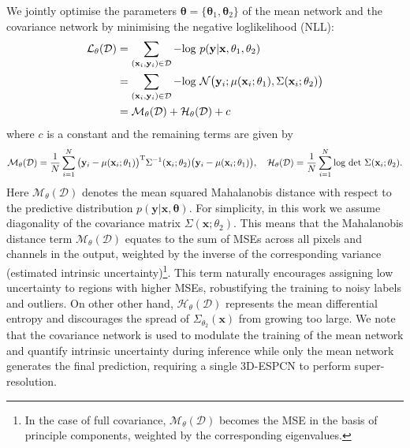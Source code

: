 We jointly optimise the parameters $\mathbf{\theta} = \{\mathbf{\theta}_1, \mathbf{\theta}_2\}$ of the mean network and the covariance network by minimising the negative loglikelihood (NLL): 
\begin{align}
\mathcal{L}_{\theta}(\mathcal{D}) 
&= \sum_{(\mathbf{x}_i,\mathbf{y}_i)\in\mathcal{D}}- \text{log } p(\mathbf{y}|\mathbf{x},\mathbf{\theta}_1, \mathbf{\theta}_2) \\
&= \sum_{(\mathbf{x}_i,\mathbf{y}_i)\in\mathcal{D}}- \text{log } \mathcal{N}\big{(}\mathbf{y}_i; \mu(\mathbf{x}_i;\mathbf{\theta}_1),\Sigma(\mathbf{x}_i;\mathbf{\theta}_2)\big{)} \\
&= \mathcal{M}_{\theta}(\mathcal{D}) + \mathcal{H}_{\theta}(\mathcal{D}) + c \label{eq:loss_hetero}
\end{align}
where $c$ is a constant and the remaining terms are given by
\begin{equation*}
\mathcal{M}_{\theta}(\mathcal{D}) = \frac{1}{N}\sum_{i=1}^{N}\big{(}\mathbf{y}_i-\mu(\mathbf{x}_i;\theta_1)\big{)}^\text{T}\Sigma^{-1}(\mathbf{x}_i;\theta_2)\big{(}\mathbf{y}_i-\mu(\mathbf{x}_i;\theta_1)\big{)}, \quad
\mathcal{H}_{\theta}(\mathcal{D}) = \frac{1}{N}\sum_{i=1}^{N}\text{log det }\Sigma( \mathbf{x}_i;\theta_2).
\end{equation*}
Here $\mathcal{M}_{\theta}(\mathcal{D})$ denotes the mean squared Mahalanobis distance with respect to the predictive distribution $p(\mathbf{y}|\mathbf{x},\mathbf{\theta})$. For simplicity, in this work we assume diagonality of the covariance matrix $\Sigma(\mathbf{x};\theta_2)$. This means that the Mahalanobis distance term $\mathcal{M}_{\theta}(\mathcal{D})$ equates to the sum of MSEs across all pixels and channels in the output, weighted by the inverse of the corresponding variance (estimated intrinsic uncertainty)\footnote{In the case of full covariance, $\mathcal{M}_{\theta}(\mathcal{D})$ becomes the MSE in the basis of principle components, weighted by the corresponding eigenvalues.}. This term naturally encourages assigning low uncertainty to regions with higher MSEs, robustifying the training to noisy labels and outliers. On other other hand, $\mathcal{H}_{\theta}(\mathcal{D})$ represents the mean differential entropy and discourages the spread of $\Sigma_{\theta_2}(\mathbf{x})$ from growing too large. We note that the covariance network is used to modulate the training of the mean network and quantify intrinsic uncertainty during inference while only the mean network generates the final prediction, requiring a single 3D-ESPCN to perform super-resolution. 


